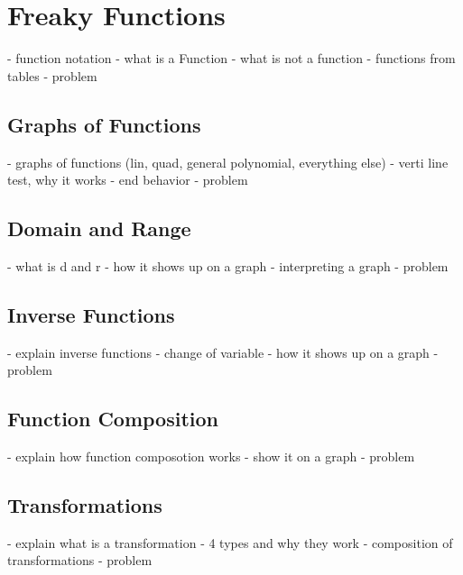\chapter{Freaky Functions}
- function notation
- what is a Function
- what is not a function
- functions from tables
- problem
\section{Graphs of Functions}
- graphs of functions (lin, quad, general polynomial, everything else)
- verti line test, why it works 
- end behavior 
- problem
\section{Domain and Range}
- what is d and r
- how it shows up on a graph
- interpreting a graph 
- problem
\section{Inverse Functions}
- explain inverse functions
- change of variable
- how it shows up on a graph
- problem
\section{Function Composition}
- explain how function composotion works
- show it on a graph
- problem
\section{Transformations}
- explain what is a transformation
- 4 types and why they work
- composition of transformations
- problem